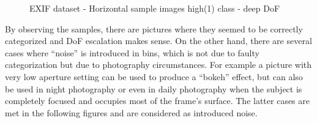 \begin{figure}[h!]
    \centering  
    \caption{EXIF dataset - Horizontal sample images high(1) class - deep DoF}
    \label{c4:vertical_high_class_samples}
\end{figure}

By observing the samples, there are pictures where they seemed to be correctly categorized and DoF escalation makes sense. On the other hand, there are several cases where ``noise'' is introduced in bins, which is not due to faulty categorization but due to photography circumstances.
For example a picture with very low aperture setting can be used to produce a ``bokeh'' effect, but can also be used in night photography or even in daily photography when the subject is completely focused and occupies most of the frame's surface. The latter cases are met in the following figures and are considered as introduced noise.

